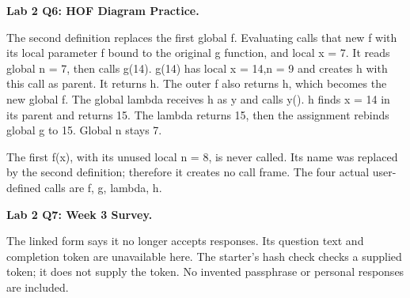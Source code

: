 \documentclass[10pt]{scrartcl}
\begin{document}
\begin{prob}
\textbf{Lab 2 Q6: HOF Diagram Practice.} 
\begin{steps}
\ii The second definition replaces the first global f. Evaluating  calls that new f with its local parameter f bound to the original g function, and local x = 7. It reads global n = 7, then calls g(14).
\ii g(14) has local x = 14,n = 9 and creates h with this call as parent. It returns h. The outer f also returns h, which becomes the new global f.
\ii The global lambda receives h as y and calls y(). h finds x = 14 in its parent and returns 15. The lambda returns 15, then the assignment rebinds global g to 15. Global n stays 7.
\end{steps}
\begin{fig}
\end{fig}
The first f(x), with its unused local n = 8, is never called. Its name was replaced by the second definition; therefore it creates no call frame. The four actual user-defined calls are f, g, lambda, h.
\end{prob}
\begin{prob}
\textbf{Lab 2 Q7: Week 3 Survey.} 
\begin{steps}
\ii The linked form says it no longer accepts responses. Its question text and completion token are unavailable here.
\ii The starter's hash check checks a supplied token; it does not supply the token. No invented passphrase or personal responses are included.
\end{steps}
\end{prob}
\end{document}
